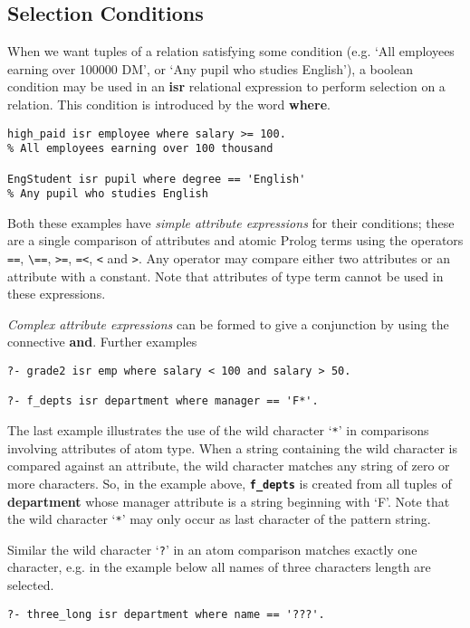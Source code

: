 \subsection{Selection Conditions}
\label{selection} 

When we want  tuples of a relation
satisfying some condition (e.g. `All employees earning over 100000 DM', or
`Any pupil who studies English'),  a boolean condition may  be
used in an {\bf isr} relational expression to perform selection
on a relation. This condition is introduced by the word {\bf where}.
\begin{verbatim}
high_paid isr employee where salary >= 100.
% All employees earning over 100 thousand

EngStudent isr pupil where degree == 'English'
% Any pupil who studies English
\end{verbatim}

Both these examples have {\em simple attribute expressions} for their
conditions; these are
a single comparison of attributes and atomic Prolog terms using the operators
\verb-==-, \verb-\==-, \verb->=-, \verb-=<-, \verb-<- and \verb->-. 
Any operator may compare either two attributes or an attribute with
a constant. Note that attributes of 
type term cannot be used in these expressions.

{\em Complex attribute expressions} can be formed to give a conjunction 
by using the connective {\bf and}. Further examples
\begin{verbatim}
?- grade2 isr emp where salary < 100 and salary > 50.

?- f_depts isr department where manager == 'F*'.
\end{verbatim}

The last example illustrates the use of the wild character `\verb-*-' in 
comparisons involving attributes of atom type. When a string containing
the wild character is compared against an attribute, the 
wild character matches any string of zero or more characters. So, in 
the example above, {\bf \verb-f_depts-} is created from all tuples of 
{\bf department} whose manager attribute is a string beginning
with `F'. Note that the wild character `\verb-*-' may only occur as last
character of the pattern string.



Similar the wild character `\verb-?-' in an atom comparison matches
exactly one character, e.g. in the example below all names of three
characters length are selected. 
\begin{verbatim}
?- three_long isr department where name == '???'.
\end{verbatim}

